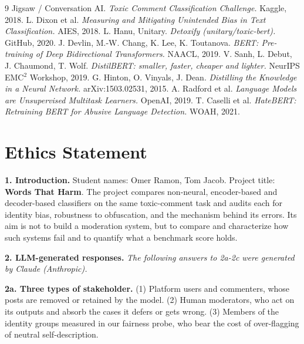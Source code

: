 \documentclass[10pt,a4paper]{article}
\begin{document}
\vspace{-0.6em}
\begin{thebibliography}{9}
\scriptsize
\setlength{\itemsep}{0pt}
\setlength{\parskip}{0pt}
 Jigsaw / Conversation AI. \emph{Toxic Comment Classification Challenge.} Kaggle, 2018.
 L. Dixon et al. \emph{Measuring and Mitigating Unintended Bias in Text Classification.} AIES, 2018.
 L. Hanu, Unitary. \emph{Detoxify (unitary/toxic-bert).} GitHub, 2020.
 J. Devlin, M.-W. Chang, K. Lee, K. Toutanova. \emph{BERT: Pre-training of Deep Bidirectional Transformers.} NAACL, 2019.
 V. Sanh, L. Debut, J. Chaumond, T. Wolf. \emph{DistilBERT: smaller, faster, cheaper and lighter.} NeurIPS EMC$^2$ Workshop, 2019.
 G. Hinton, O. Vinyals, J. Dean. \emph{Distilling the Knowledge in a Neural Network.} arXiv:1503.02531, 2015.
 A. Radford et al. \emph{Language Models are Unsupervised Multitask Learners.} OpenAI, 2019.
 T. Caselli et al. \emph{HateBERT: Retraining BERT for Abusive Language Detection.} WOAH, 2021.
\end{thebibliography}

\section*{Ethics Statement}

\textbf{1. Introduction.}
Student names: Omer Ramon, Tom Jacob. Project title: \textbf{Words That Harm}. The
project compares non-neural, encoder-based and decoder-based classifiers on the same
toxic-comment task and audits each for identity bias, robustness to obfuscation, and the mechanism behind its errors. Its aim is not to build a moderation system, but to compare and characterize how such systems fail and to quantify what a benchmark score holds.

\textbf{2. LLM-generated responses.} \emph{The following answers to 2a-2c were
generated by Claude (Anthropic).}

\textbf{2a. Three types of stakeholder.} (1) Platform users and commenters, whose posts
are removed or retained by the model. (2) Human moderators, who act on its outputs
and absorb the cases it defers or gets wrong. (3) Members of the identity groups
measured in our fairness probe, who bear the cost of over-flagging of neutral
self-description.
\end{document}
